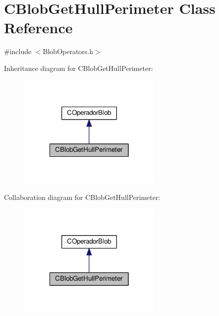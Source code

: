 \hypertarget{classCBlobGetHullPerimeter}{\section{C\-Blob\-Get\-Hull\-Perimeter Class Reference}
\label{classCBlobGetHullPerimeter}
}


{\ttfamily \#include $<$Blob\-Operators.\-h$>$}



Inheritance diagram for C\-Blob\-Get\-Hull\-Perimeter\-:\nopagebreak
\begin{figure}[H]
\begin{center}
\leavevmode
\includegraphics[width=198pt]{classCBlobGetHullPerimeter__inherit__graph}
\end{center}
\end{figure}


Collaboration diagram for C\-Blob\-Get\-Hull\-Perimeter\-:\nopagebreak
\begin{figure}[H]
\begin{center}
\leavevmode
\includegraphics[width=198pt]{classCBlobGetHullPerimeter__coll__graph}
\end{center}
\end{figure}

